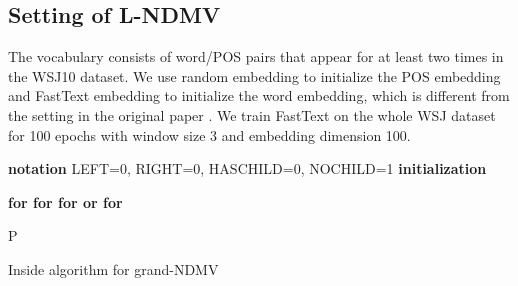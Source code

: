 \documentclass[11pt]{article}
\begin{document}
\subsection{Setting of L-NDMV}
The vocabulary consists of word/POS pairs that appear for at least two times in the WSJ10 dataset. We use random embedding to initialize the POS embedding and FastText embedding to initialize the word embedding, which is different from the setting in the original paper \cite{Han2017DependencyGI}. We train FastText on the whole WSJ dataset for 100 epochs with window size 3 and embedding dimension 100. 
\begin{algorithm}[t]
\footnotesize
\SetAlgoLined
\textbf{notation} LEFT=0, RIGHT=0, HASCHILD=0, NOCHILD=1 \newline
\textbf{initialization}
  
  
  
   \newline
\bfseries{for}  \newline
 \hspace*{1em} \bfseries{for} \newline
 \hspace*{2em}  \newline
 \hspace*{2em} \bfseries{for}  \bfseries{or}   \newline
 \hspace*{3em}  \newline
  \hspace*{3em}  \newline
   \hspace*{3em}  \newline
  \hspace*{3em}  \newline
     \hspace*{3em}  \newline
     \hspace*{3em}  \newline
     \hspace*{3em}  \newline
  \hspace*{3em}  \newline
\bfseries{for} \newline
\hspace*{1em}  

 \newline
\Return P

 \caption{Inside algorithm for grand-NDMV}
 \label{eisner grand}
\end{algorithm}
\end{document}
